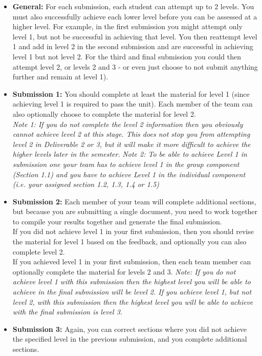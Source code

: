 \documentclass[a4paper, 11pt]{report}
\begin{document}
\begin{itemize}
    \item \textbf{General:} For each submission, each student can attempt up to 2 levels. You must also successfully achieve each lower level before you can be assessed at a higher level. For example, in the first submission you might attempt only level 1, but not be successful in achieving that level. You then reattempt level 1 and add in level 2 in the second submission and are successful in achieving level 1 but not level 2. For the third and final submission you could then attempt level 2, or levels 2 and 3 - or even just choose to not submit anything further and remain at level 1).
    \item \textbf{Submission 1:} You should complete at least the material for level 1 (since achieving level 1 is required to pass the unit). Each member of the team can also optionally choose to complete the material for level 2.\\
    \textit{Note 1: If you do not complete the level 2 information then you obviously cannot achieve level 2 at this stage. This does not stop you from attempting level 2 in Deliverable 2 or 3, but it will make it more difficult to achieve the higher levels later in the semester.}
    \textit{Note 2: To be able to achieve Level 1 in submission one your team has to achieve level 1 in the group component (Section 1.1) and you have to achieve Level 1 in the individual component (i.e. your assigned section 1.2, 1.3, 1.4 or 1.5)}
    \item \textbf{Submission 2:} Each member of your team will complete additional sections, but because you are submitting a single document, you need to work together to compile your results together and generate the final submission.\\
    If you did not achieve level 1 in your first submission, then you should revise the material for level 1 based on the feedback, and optionally you can also complete level 2.\\
    If you achieved level 1 in your first submission, then each team member can optionally complete the material for levels 2 and 3.
    \textit{Note: If you do not achieve level 1 with this submission then the highest level you will be able to achieve in the final submission will be level 2. If you achieve level 1, but not level 2, with this submission then the highest level you will be able to achieve with the final submission is level 3.}
    \item \textbf{Submission 3:} Again, you can correct sections where you did not achieve the specified level in the previous submission, and you complete additional sections.\\

\end{itemize}
\end{document}
